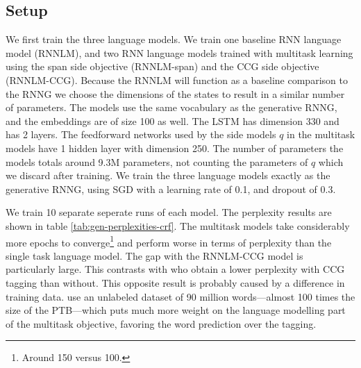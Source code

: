   \subsection{Setup}
    We first train the three language models. We train one baseline RNN language model (RNNLM), and two RNN language models trained with multitask learning using the span side objective (RNNLM-span) and the CCG side objective (RNNLM-CCG). Because the RNNLM will function as a baseline comparison to the RNNG we choose the dimensions of the states to result in a similar number of parameters. The models use the same vocabulary as the generative RNNG, and the embeddings are of size 100 as well. The LSTM has dimension 330 and has 2 layers. The feedforward networks used by the side models $q$ in the multitask models have 1 hidden layer with dimension 250. The number of parameters the models totals around 9.3M parameters, not counting the parameters of $q$ which we discard after training. We train the three language models exactly as the generative RNNG, using SGD with a learning rate of 0.1, and dropout of 0.3.

    

    We train 10 separate seperate runs of each model. The perplexity results are shown in table \ref{tab:gen-perplexities-crf}. The multitask models take considerably more epochs to converge\footnote{Around 150 versus 100.} and perform worse in terms of perplexity than the single task language model. The gap with the RNNLM-CCG model is particularly large. This contrasts with \citet{linzen2018targeted} who obtain a lower perplexity with CCG tagging than without. This opposite result is probably caused by a difference in training data. \citet{linzen2018targeted} use an unlabeled dataset of 90 million words---almost 100 times the size of the PTB---which puts much more weight on the language modelling part of the multitask objective, favoring the word prediction over the tagging.

